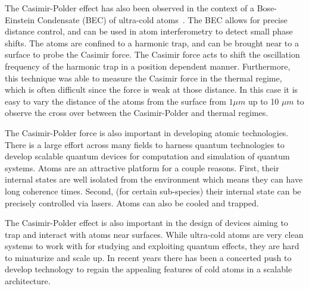     The Casimir-Polder effect has also been observed in the context of a Bose-Einstein Condensate (BEC)
    of ultra-cold atoms~\cite{Harber2005,Obrecht2007}.  The BEC allows for precise distance control,
    and can be used in atom interferometry to detect small phase shifts.    
    The atoms are confined to a harmonic trap, and can be brought near to a surface to probe the Casimir
    force.  The Casimir force acts to shift the oscillation frequency of the harmonic trap in a position
    dependent manner.  
    Furthermore, this technique was able to measure the Casimir force in the thermal regime, which
    is often difficult since the force is weak at those distance.  In this case it is easy to 
    vary the distance of the atoms from the surface from $1\mu m$ up to 10 $\mu m$ to observe
    the cross over between the Casimir-Polder and thermal regimes.

The Casimir-Polder force is also important in developing atomic technologies.  
There is a large effort across many fields to harness quantum technologies to develop scalable 
quantum devices for computation and simulation of quantum systems.  
Atoms are an attractive platform for a couple reasons.  
First, their internal states are well isolated from the environment which means they can have long coherence times.
Second, (for certain sub-species) their internal state can be precisely controlled via lasers.  
Atoms can also be cooled and trapped.  


    The Casimir-Polder effect is also important in the design of devices aiming to trap and interact
    with atoms near surfaces.  While ultra-cold atoms are very clean systems to work with for 
    studying and exploiting quantum effects, they are hard to minaturize and scale up.  In recent
    years there has been a concerted push to develop technology to regain the appealing features 
    of cold atoms in a scalable architecture. 

